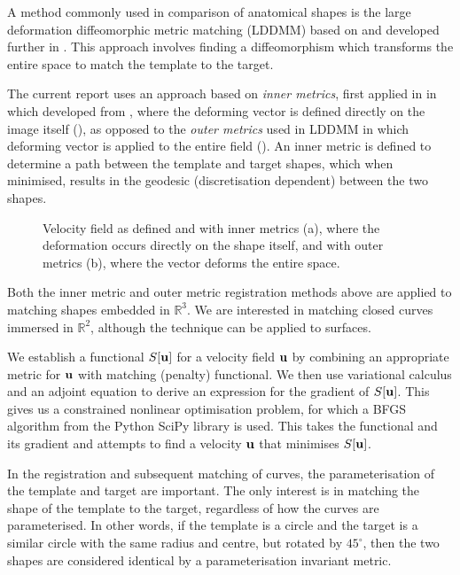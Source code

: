 \documentclass[a4paper, 12pt]{article}
\begin{document}
A method commonly used in comparison of anatomical shapes is the large deformation
diffeomorphic metric matching (LDDMM) based on \cite{grenander1993general}
and developed further in
\cite{beg2005computing,bruveris2011momentum,glaunes2008large}. This approach
involves finding a diffeomorphism which transforms the entire space to match the
template to the target. 

The current report uses an approach based on \emph{inner metrics}, first applied in
in \cite{bauer2011new} which developed from
\cite{michor2005vanishing,michor2003riemannian,younes2008metric}, where the
deforming vector is defined directly on the image itself (), as opposed to the
\emph{outer metrics} used in LDDMM in which deforming vector is applied to the
entire field (). An inner metric is defined to determine a path between the
template and target shapes, which when minimised, results in the geodesic
(discretisation dependent) between the two shapes.

\begin{figure}[h!]
  \centering
  \caption{Velocity field as defined and with inner metrics (a), where the
    deformation occurs directly on the shape itself, and with outer metrics
    (b), where the vector deforms the entire space.}
  \label{fig:metrics}
\end{figure}

Both the inner metric and outer metric registration methods above are applied to
matching shapes embedded in $\mathbb{R}^3$. We are interested in matching closed
curves immersed in $\mathbb{R}^2$, although the technique can be applied to
surfaces.


We establish a functional $S[\mathbf{u}]$ for a velocity field $\mathbf{u}$ by
combining an appropriate metric for $\mathbf{u}$ with matching (penalty)
functional. We then use variational calculus and an adjoint equation to derive an
expression for the gradient of $S[\mathbf{u}]$. This gives us a constrained
nonlinear optimisation problem, for which a BFGS algorithm from the Python
SciPy\cite{scipy} library is used. This takes the functional and its gradient
and attempts to find a velocity $\mathbf{u}$ that minimises $S[\mathbf{u}]$.


In the registration and subsequent matching of curves, the parameterisation of
the template and target are important. The only interest is in matching the
shape of the template to the target, regardless of how the curves are
parameterised. In other words, if the template is a circle and the target is a
similar circle with the same radius and centre, but rotated by $45^{\circ}$,
then the two shapes are considered identical by a parameterisation invariant
metric. 
\end{document}
